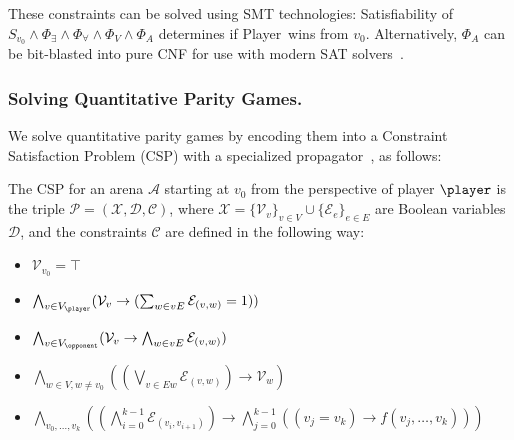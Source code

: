 \documentclass[runningheads]{llncs}
\begin{document}
These constraints can be solved using SMT technologies: Satisfiability of $S_{v_0} \wedge \Phi_\exists \wedge \Phi_\forall \wedge \Phi_V \wedge \Phi_A$ determines if Player~\even wins from $v_0$. Alternatively, $\Phi_A$ can be bit-blasted into pure CNF for use with modern SAT solvers~\cite{Heljanko:2012}.

\subsubsection{Solving Quantitative Parity Games.}
We solve quantitative parity games by encoding them into a Constraint Satisfaction Problem (CSP) with a specialized propagator~\cite{Hernandez:2026:noc}, as follows: 

\begin{definition}\label{def:csp}
    The CSP for an arena $\mathcal{A}$
    starting at $v_0$ from the perspective of player $\player$ is the triple $\mathcal{P} = (\mathcal{X}, \mathcal{D}, \mathcal{C})$, where $\mathcal{X} = \{ \mathcal{V}_v \}_{v \in V} \cup \{ \mathcal{E}_e \}_{e \in E}$ are Boolean variables $\mathcal{D}$, and the constraints $\mathcal{C}$ are defined in the following way:
    \begin{itemize}
        [leftmargin=2.3cm, labelwidth=2.8cm, align=right, itemsep=1.0ex, parsep=0pt]

        \item [$\mathcal{C}_{v_0}$ :] $\mathcal{V}_{v_0} = \top$

        \item [$\mathcal{C}_{\player}$ :] $\bigwedge_{v \in V_{\player}} (\mathcal{V}_v \rightarrow (\sum_{w \in vE} \mathcal{E}_{(v,w)}= 1))$

        \item [$\mathcal{C}_{\opponent}$ :] $\bigwedge_{v \in V_{\opponent}} (\mathcal{V}_v \rightarrow \bigwedge_{w \in vE} \mathcal{E}_{(v,w)})$

        \item [$\mathcal{C}_{\!E}$ :] $\bigwedge_{w \in V, w \neq v_0} ((\bigvee_{v \in Ew} \mathcal{E}_{(v,w)}) \rightarrow \mathcal{V}_w)$

        \item [$\mathcal{C}_{NOC}(f)$ :] $\bigwedge_{v_0, \dots, v_k} \left( \left(\bigwedge_{i=0}^{k-1} \mathcal{E}_{(v_i,v_{i+1})}\right) \to \bigwedge_{j=0}^{k-1} ((v_j = v_k) \to f(v_j, \dots, v_k)) \right)$


\end{itemize}
\end{definition}
\end{document}
